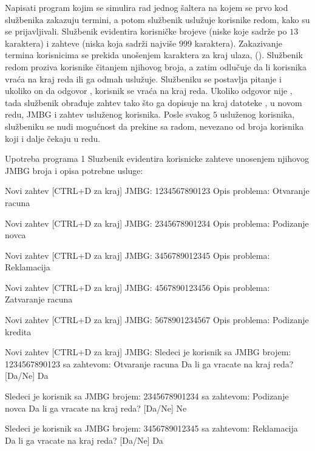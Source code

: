 \begin{Exercise}[label=606]
Napisati program kojim se simulira rad jednog šaltera na kojem se prvo kod službenika zakazuju 
termini, a potom službenik uslužuje korisnike redom, kako su se prijavljivali.
Službenik evidentira korisničke  brojeve (niske koje sadrže po $13$ karaktera) i zahteve (niska koja sadrži najviše $999$ karaktera). 
Zakazivanje termina korisnicima se prekida unošenjem karaktera za kraj ulaza, ().
Službenik redom proziva korisnike čitanjem njihovog  broja, a zatim odlučuje da li 
korisnika vraća na kraj reda ili ga odmah uslužuje. Službeniku se postavlja pitanje 
 i ukoliko on da odgovor , 
korisnik se vraća na kraj reda. Ukoliko odgovor nije , tada službenik obrađuje zahtev tako što ga dopisuje na kraj datoteke , 
u novom redu, JMBG i zahtev usluženog korisnika.
Posle svakog $5$ usluženog korisnika, službeniku se nudi mogućnost da prekine sa radom, nevezano od broja korisnika koji i dalje čekaju u redu. 

\begin{maxitest}
\begin{test}{Upotreba programa 1}
Sluzbenik evidentira korisnicke zahteve unosenjem 
njihovog JMBG broja i opisa potrebne usluge:

Novi zahtev [CTRL+D za kraj]
        JMBG: 1234567890123
        Opis problema: Otvaranje racuna

Novi zahtev [CTRL+D za kraj]
        JMBG: 2345678901234
        Opis problema: Podizanje novca

Novi zahtev [CTRL+D za kraj]
        JMBG: 3456789012345
        Opis problema: Reklamacija

Novi zahtev [CTRL+D za kraj]
        JMBG: 4567890123456
        Opis problema: Zatvaranje racuna

Novi zahtev [CTRL+D za kraj]
        JMBG: 5678901234567
        Opis problema: Podizanje kredita

Novi zahtev [CTRL+D za kraj]
        JMBG: 
Sledeci je korisnik sa JMBG brojem: 1234567890123
sa zahtevom: Otvaranje racuna
        Da li ga vracate na kraj reda? [Da/Ne] Da

Sledeci je korisnik sa JMBG brojem: 2345678901234
sa zahtevom: Podizanje novca
        Da li ga vracate na kraj reda? [Da/Ne] Ne

Sledeci je korisnik sa JMBG brojem: 3456789012345
sa zahtevom: Reklamacija
        Da li ga vracate na kraj reda? [Da/Ne] Da


\end{test}
\end{maxitest}
\end{Exercise}
